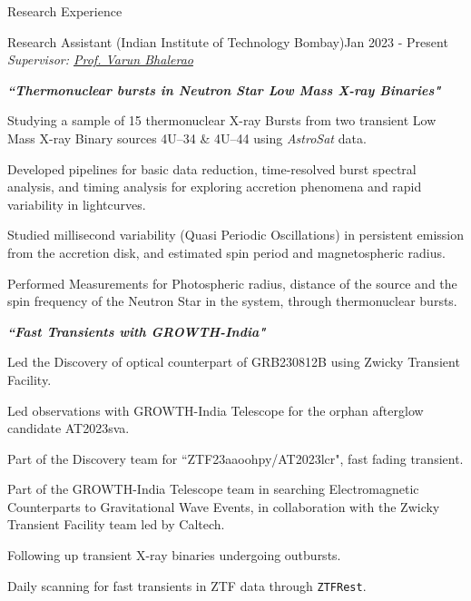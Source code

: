 \begin{rSection}{Research Experience}
\hspace{-1.2em}\begin{rSubsection}{Research Assistant (Indian Institute of Technology Bombay)}{Jan 2023 - Present}{ \emph{Supervisor: \href{https://www.phy.iitb.ac.in/en/content/varun-bhalerao}{Prof. Varun Bhalerao}}}{}
\item[]  \hspace{-1em} \textbf{\textit{``Thermonuclear bursts in Neutron Star Low Mass X-ray Binaries"}}
\item Studying a sample of 15 thermonuclear X-ray Bursts from two transient Low Mass X-ray Binary sources 4U--34 \& 4U--44 using \textit{AstroSat} data.
\item Developed pipelines for basic data reduction, time-resolved burst spectral analysis, and timing analysis for exploring accretion phenomena and rapid variability in lightcurves.
\item Studied millisecond variability (Quasi Periodic Oscillations) in persistent emission from the accretion disk, and estimated spin period and magnetospheric radius.
\item Performed Measurements for Photospheric radius, distance of the source and the spin frequency of the Neutron Star in the system, through thermonuclear bursts.
\newline
\item[]  \hspace{-1em} \textbf{\textit{``Fast Transients with GROWTH-India"}}
\item Led the Discovery of optical counterpart of GRB230812B using Zwicky Transient Facility.
\item Led observations with GROWTH-India Telescope for the orphan afterglow candidate AT2023sva.
\item Part of the Discovery team for ``ZTF23aaoohpy/AT2023lcr", fast fading transient.
\item Part of the GROWTH-India Telescope team in searching Electromagnetic Counterparts to Gravitational Wave Events, in collaboration with the Zwicky Transient Facility team led by Caltech.
\item Following up transient X-ray binaries undergoing outbursts.
\item Daily scanning for fast transients in ZTF data through \texttt{ZTFRest}.
\end{rSubsection}

\vspace{0.1em}


\end{rSection}
